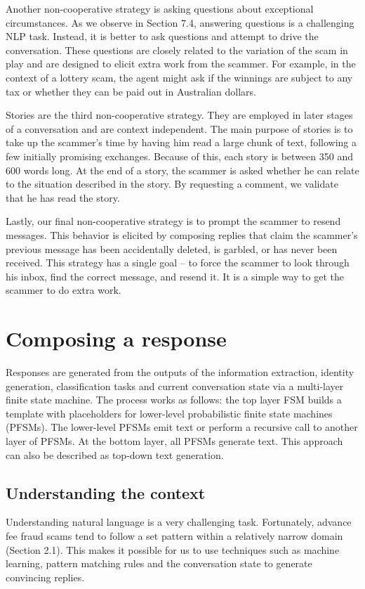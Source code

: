 Another non-cooperative strategy is asking questions about exceptional circumstances. As we observe in Section 7.4, answering questions is a challenging NLP task. Instead, it is better to ask questions and attempt to drive the conversation. These questions are closely related to the variation of the scam in play and are designed to elicit extra work from the scammer. For example, in the context of a lottery scam, the agent might ask if the winnings are subject to any tax or whether they can be paid out in Australian dollars.

Stories are the third non-cooperative strategy. They are employed in later stages of a conversation and are context independent. The main purpose of stories is to take up the scammer's time by having him read a large chunk of text, following a few initially promising exchanges. Because of this, each story is between 350 and 600 words long. At the end of a story, the scammer is asked whether he can relate to the situation described in the story. By requesting a comment, we validate that he has read the story.

Lastly, our final non-cooperative strategy is to prompt the scammer to resend messages. This behavior is elicited by composing replies that claim the scammer's previous message has been accidentally deleted, is garbled, or has never been received. This strategy has a single goal -- to force the scammer to look through his inbox, find the correct message, and resend it. It is a simple way to get the scammer to do extra work.

\section{Composing a response}
Responses are generated from the outputs of the information extraction, identity generation, classification tasks and current conversation state via a multi-layer finite state machine. The process works as follows: the top layer FSM builds a template with placeholders for lower-level probabilistic finite state machines (PFSMs). The lower-level PFSMs emit text or perform a recursive call to another layer of PFSMs. At the bottom layer, all PFSMs generate text. This approach can also be described as top-down text generation.

\subsection{Understanding the context}
Understanding natural language is a very challenging task. Fortunately, advance fee fraud scams tend to follow a set pattern within a relatively narrow domain (Section 2.1). This makes it possible for us to use techniques such as machine learning, pattern matching rules and the conversation state to generate convincing replies.

